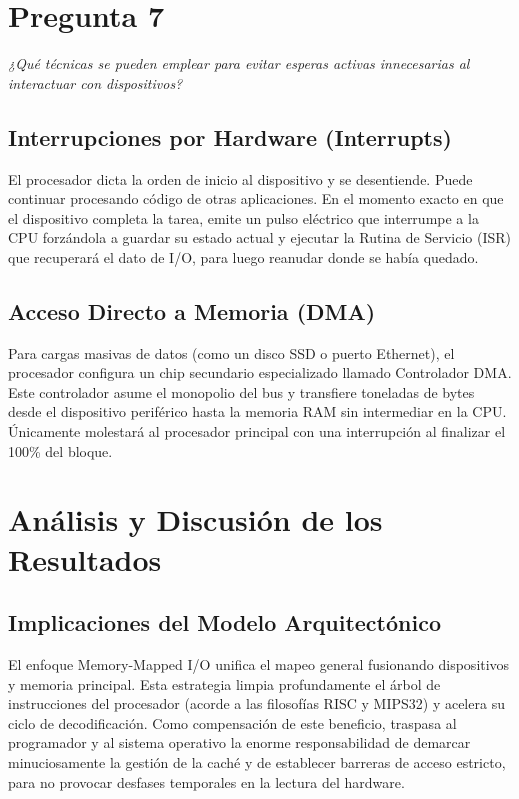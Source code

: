 \documentclass[12pt,a4paper]{article}
\begin{document}
	\section{Pregunta 7}
	\textit{¿Qué técnicas se pueden emplear para evitar esperas activas innecesarias al interactuar con dispositivos?}
	
	\subsection{Interrupciones por Hardware (Interrupts)}
	El procesador dicta la orden de inicio al dispositivo y se desentiende. Puede continuar procesando código de otras aplicaciones. En el momento exacto en que el dispositivo completa la tarea, emite un pulso eléctrico que interrumpe a la CPU forzándola a guardar su estado actual y ejecutar la Rutina de Servicio (ISR) que recuperará el dato de I/O, para luego reanudar donde se había quedado.
	
	\subsection{Acceso Directo a Memoria (DMA)}
	Para cargas masivas de datos (como un disco SSD o puerto Ethernet), el procesador configura un chip secundario especializado llamado Controlador DMA. Este controlador asume el monopolio del bus y transfiere toneladas de bytes desde el dispositivo periférico hasta la memoria RAM sin intermediar en la CPU. Únicamente molestará al procesador principal con una interrupción al finalizar el 100\% del bloque.
	
	\section{Análisis y Discusión de los Resultados}
	
	\subsection{Implicaciones del Modelo Arquitectónico}
	El enfoque Memory-Mapped I/O unifica el mapeo general fusionando dispositivos y memoria principal. Esta estrategia limpia profundamente el árbol de instrucciones del procesador (acorde a las filosofías RISC y MIPS32) y acelera su ciclo de decodificación. Como compensación de este beneficio, traspasa al programador y al sistema operativo la enorme responsabilidad de demarcar minuciosamente la gestión de la caché y de establecer barreras de acceso estricto, para no provocar desfases temporales en la lectura del hardware.
	
\end{document}
